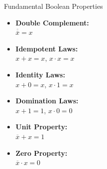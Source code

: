 \begin{custombox}{Fundamental Boolean Properties}
\begin{itemize}
    \item \textbf{Double Complement:} \\
    \hspace*{15pt} $\overline{\overline{x}} = x$\hspace{15pt}
    
    \item \textbf{Idempotent Laws:} \\
    \hspace*{15pt}$x + x = x$, \quad $x \cdot x = x$
    
    \item \textbf{Identity Laws:} \\
    \hspace*{15pt}$x + 0 = x$, \quad $x \cdot 1 = x$
    
    \item \textbf{Domination Laws:} \\
    \hspace*{15pt}$x + 1 = 1$, \quad $x \cdot 0 = 0$
    
    \item \textbf{Unit Property:} \\
    \hspace*{15pt}$\overline{x} + x = 1$
    
    \item \textbf{Zero Property:} \\
    \hspace*{15pt} $\overline{x} \cdot x = 0$
\end{itemize}
\end{custombox}

